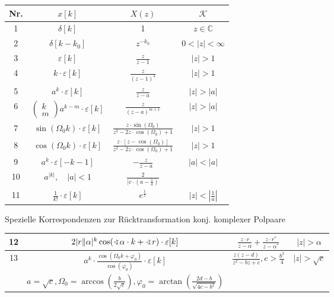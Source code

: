 \begin{tabular}{|c|c|c|c|}
\hline Nr. & $x[k]$ & $X(z)$ & $\mathcal{K}$ \\
\hline \hline 1 & $\delta[k]$ & 1 & $z \in \mathbb{C}$ \\
\hline 2 & $\delta\left[k-k_{0}\right]$ & $z^{-k_{0}}$ & $0<|z|<\infty$ \\
\hline 3 & $\varepsilon[k]$ & $\frac{z}{z-1}$ & $|z|>1$ \\
\hline 4 & $k \cdot \varepsilon[k]$ & $\frac{z}{(z-1)^{2}}$ & $|z|>1$ \\
\hline 5 & $a^{k} \cdot \varepsilon[k]$ & $\frac{z}{z-a}$ & $|z|>|a|$ \\
\hline 6 & $\left(\begin{array}{c}k \\
m\end{array}\right) a^{k-m} \cdot \varepsilon[k]$ & $\frac{z}{(z-a)^{m+1}}$ & $|z|>|a|$ \\
\hline 7 & $\sin \left(\Omega_{0} k\right) \cdot \varepsilon[k]$ & $\frac{z \cdot \sin \left(\Omega_{0}\right)}{z^{2}-2 z \cdot \cos \left(\Omega_{0}\right)+1}$ & $|z|>1$ \\
\hline 8 & $\cos \left(\Omega_{0} k\right) \cdot \varepsilon[k]$ & $\frac{z \cdot\left[z-\cos \left(\Omega_{0}\right)\right]}{z^{2}-2 z \cdot \cos \left(\Omega_{0}\right)+1}$ & $|z|>1$ \\
\hline 9 & $a^{k} \cdot \varepsilon[-k-1]$ & $-\frac{z}{z-a}$ & $|a|<|a|$ \\
\hline 10 & $a^{|k|}, \quad|a|<1$ & $\frac{2}{\mid c \cdot\left(a-\frac{1}{a}\right)}$ \\
\hline 11 & $\frac{1}{k !} \cdot \varepsilon[k]$ & $e^{\frac{1}{z}}$ & $|z|<\left|\frac{1}{a}\right|$ \\
\hline
\end{tabular}

Spezielle Korrespondenzen zur Rücktransformation konj. komplexer Polpaare

\begin{tabular}{|c|c|c|c|}
\hline 12 & $2|r \| \alpha|^{k} \cos (\varangle \alpha \cdot k+ \varangle r) \cdot \varepsilon[k]$ & $\frac{z \cdot r}{z-\alpha}+\frac{z \cdot r^{*}}{z-\alpha^{*}}$ & $|z|>\alpha$ \\
\hline 13 & $a^{k} \cdot \frac{\cos \left(\Omega_{0} k+\varphi_{0}\right)}{\cos \left(\varphi_{0}\right)} \cdot \varepsilon[k]$ & $\frac{z(z-d)}{z^{2}-b z+c}, c>\frac{b^{2}}{4}$ & $|z|>\sqrt{c}$ \\
& $a=\sqrt{c}, \Omega_{0}=\arccos \left(\frac{b}{2 \sqrt{c}}\right), \varphi_{0}=\arctan \left(\frac{2 d-b}{\sqrt{4 c-b^{2}}}\right)$ & \\
\hline
\end{tabular}



